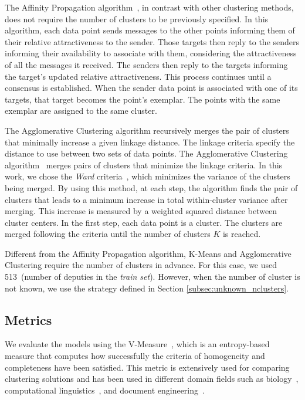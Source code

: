 The Affinity Propagation algorithm~\cite{frey2007clustering}, in contrast with other clustering methods, does not require the number of clusters to be previously specified.
In this algorithm, each data point sends messages to the other points informing them of their relative attractiveness to the sender. 
Those targets then reply to the senders informing their availability to associate with them, considering the attractiveness of all the messages it received.
The senders then reply to the targets informing the target's updated relative attractiveness.
This process continues until a consensus is established.
When the sender data point is associated with one of its targets, that target becomes the point's exemplar.
The points with the same exemplar are assigned to the same cluster.

The Agglomerative Clustering algorithm recursively merges the pair of clusters that minimally increase a given linkage distance.
The linkage criteria specify the distance to use between two sets of data points.
The Agglomerative Clustering algorithm~\cite{ward1963hierarchical} merges pairs of clusters that minimize the linkage criteria.
In this work, we chose the \emph{Ward} criteria~\cite{ward1963hierarchical}, which minimizes the variance of the clusters being merged.
By using this method, at each step, the algorithm finds the pair of clusters that leads to a minimum increase in total within-cluster variance after merging.
This increase is measured by a weighted squared distance between cluster centers.
In the first step, each data point is a cluster.
The clusters are merged following the criteria until the number of clusters $K$ is reached.

Different from the Affinity Propagation algorithm, K-Means and Agglomerative Clustering require the number of clusters in advance. For this case, we used 513~(number of deputies in the \emph{train set}).
However, when the number of cluster is not known, we use the strategy defined in Section \ref{subsec:unknown_nclusters}.

\subsection{Metrics}

We evaluate the models using the V-Measure~\cite{vmeasure}, which is an entropy-based measure that computes how successfully the criteria of homogeneity and completeness have been satisfied. This metric is extensively used for comparing clustering solutions and has been used in different domain fields such as biology~\cite{bio1}, computational linguistics~\cite{nlp1}, and document engineering~\cite{doceng}.


